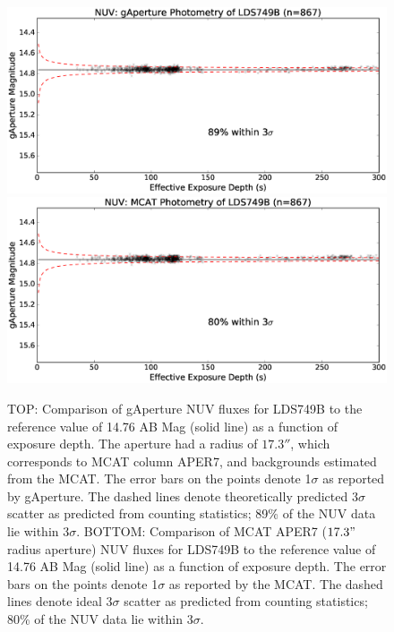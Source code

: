 \documentclass[preprint]{aastex}
\begin{document}
\begin{figure}[t!]
\begin{minipage}[c][11cm][c]{1.\textwidth}
\centering
\includegraphics[scale=0.625]{Fig08a.eps}
\includegraphics[scale=0.625]{Fig08b.eps}
\caption{TOP: Comparison of gAperture NUV fluxes for LDS749B to the reference value of 14.76 AB Mag (solid line) as a function of exposure depth. The aperture had a radius of $17.3''$, which corresponds to MCAT column APER7, and backgrounds estimated from the MCAT. The error bars on the points denote 1$\sigma$ as reported by gAperture. The dashed lines denote theoretically predicted 3$\sigma$ scatter as predicted from counting statistics; 89\% of the NUV data lie within 3$\sigma$.  BOTTOM: Comparison of MCAT APER7 ($17.3"$ radius aperture) NUV fluxes for LDS749B to the reference value of 14.76 AB Mag (solid line) as a function of exposure depth. The error bars on the points denote 1$\sigma$ as reported by the MCAT. The dashed lines denote ideal 3$\sigma$ scatter as predicted from counting statistics; 80\% of the NUV data lie within 3$\sigma$.
\label{ldsabsphotnuv}}
\end{minipage}
\end{figure}
\end{document}
